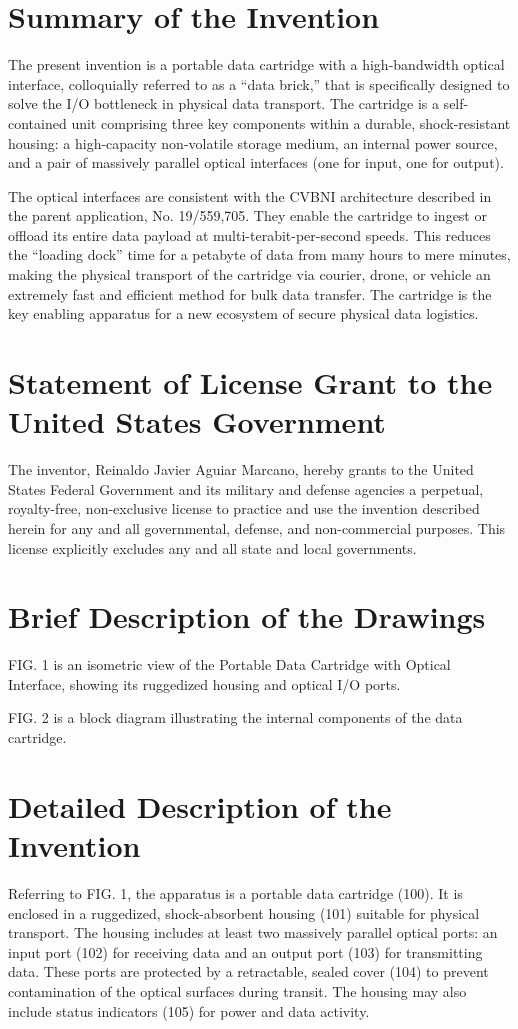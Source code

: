\documentclass[11pt,letterpaper]{article}
\begin{document}
\section*{Summary of the Invention}
The present invention is a portable data cartridge with a high-bandwidth optical interface, colloquially referred to as a ``data brick,'' that is specifically designed to solve the I/O bottleneck in physical data transport. The cartridge is a self-contained unit comprising three key components within a durable, shock-resistant housing: a high-capacity non-volatile storage medium, an internal power source, and a pair of massively parallel optical interfaces (one for input, one for output).

The optical interfaces are consistent with the CVBNI architecture described in the parent application, No. 19/559,705. They enable the cartridge to ingest or offload its entire data payload at multi-terabit-per-second speeds. This reduces the ``loading dock'' time for a petabyte of data from many hours to mere minutes, making the physical transport of the cartridge via courier, drone, or vehicle an extremely fast and efficient method for bulk data transfer. The cartridge is the key enabling apparatus for a new ecosystem of secure physical data logistics.

\section*{Statement of License Grant to the United States Government}
The inventor, Reinaldo Javier Aguiar Marcano, hereby grants to the United States Federal Government and its military and defense agencies a perpetual, royalty-free, non-exclusive license to practice and use the invention described herein for any and all governmental, defense, and non-commercial purposes. This license explicitly excludes any and all state and local governments.

\section*{Brief Description of the Drawings}
FIG. 1 is an isometric view of the Portable Data Cartridge with Optical Interface, showing its ruggedized housing and optical I/O ports.

FIG. 2 is a block diagram illustrating the internal components of the data cartridge.

\section*{Detailed Description of the Invention}
Referring to FIG. 1, the apparatus is a portable data cartridge (100). It is enclosed in a ruggedized, shock-absorbent housing (101) suitable for physical transport. The housing includes at least two massively parallel optical ports: an input port (102) for receiving data and an output port (103) for transmitting data. These ports are protected by a retractable, sealed cover (104) to prevent contamination of the optical surfaces during transit. The housing may also include status indicators (105) for power and data activity.
\end{document}
